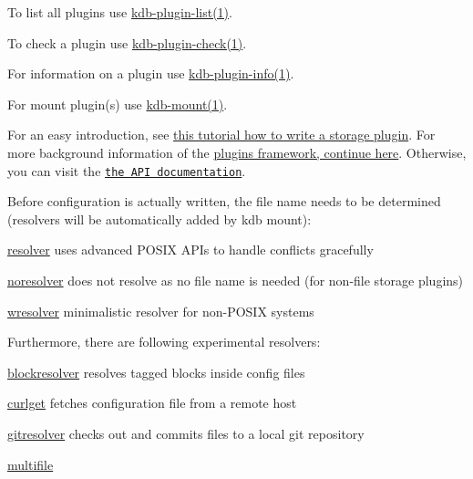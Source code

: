 \begin{DoxyItemize}
\item To list all plugins use \hyperlink{doc_help_kdb-plugin-list_md}{kdb-\/plugin-\/list(1)}.
\item To check a plugin use \hyperlink{doc_help_kdb-plugin-check_md}{kdb-\/plugin-\/check(1)}.
\item For information on a plugin use \hyperlink{doc_help_kdb-plugin-info_md}{kdb-\/plugin-\/info(1)}.
\item For mount plugin(s) use \hyperlink{doc_help_kdb-mount_md}{kdb-\/mount(1)}.
\end{DoxyItemize}

For an easy introduction, see \hyperlink{doc_tutorials_plugins_md}{this tutorial how to write a storage plugin}. For more background information of the \hyperlink{doc_dev_plugins-framework_md}{plugins framework, continue here}. Otherwise, you can visit the \href{https://doc.libelektra.org/api/latest/html/group__plugin.html}{\tt the A\+PI documentation}.

Before configuration is actually written, the file name needs to be determined (resolvers will be automatically added by kdb mount)\+:


\begin{DoxyItemize}
\item \hyperlink{autotoc_md586_src_plugins_resolver_README_md}{resolver} uses advanced P\+O\+S\+IX A\+P\+Is to handle conflicts gracefully
\item \hyperlink{autotoc_md485_src_plugins_noresolver_README_md}{noresolver} does not resolve as no file name is needed (for non-\/file storage plugins)
\item \hyperlink{autotoc_md772_src_plugins_wresolver_README_md}{wresolver} minimalistic resolver for non-\/\+P\+O\+S\+IX systems
\end{DoxyItemize}

Furthermore, there are following experimental resolvers\+:


\begin{DoxyItemize}
\item \hyperlink{autotoc_md64_src_plugins_blockresolver_README_md}{blockresolver} resolves tagged blocks inside config files
\item \hyperlink{autotoc_md140_src_plugins_curlget_README_md}{curlget} fetches configuration file from a remote host
\item \hyperlink{autotoc_md235_src_plugins_gitresolver_README_md}{gitresolver} checks out and commits files to a local git repository
\item \hyperlink{autotoc_md454_src_plugins_multifile_README_md}{multifile}
\end{DoxyItemize}

